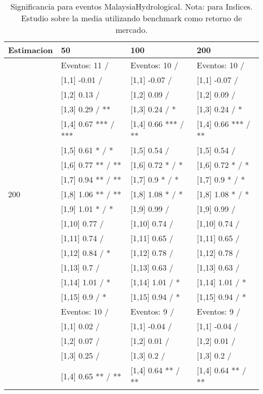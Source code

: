 \begin{table}

\caption{Significancia para eventos MalaysiaHydrological. Nota: para Indices. Estudio sobre la media utilizando benchmark como retorno de mercado.}
\centering
\begin{tabular}[t]{llll}
\toprule
Estimacion & 50 & 100 & 200\\
\midrule
 & Eventos:  11 / & Eventos:  10 / & Eventos:  10 /\\
 & {}[1,1] -0.01  / & {}[1,1] -0.07  / & {}[1,1] -0.07  /\\
 & {}[1,2] 0.13  / & {}[1,2] 0.09  / & {}[1,2] 0.09  /\\
 & {}[1,3] 0.29  / ** & {}[1,3] 0.24  / * & {}[1,3] 0.24  / *\\
 & {}[1,4] 0.67 *** / *** & {}[1,4] 0.66 *** / ** & {}[1,4] 0.66 *** / **\\
\addlinespace
 & {}[1,5] 0.61 * / * & {}[1,5] 0.54  / & {}[1,5] 0.54  /\\
 & {}[1,6] 0.77 ** / ** & {}[1,6] 0.72 * / * & {}[1,6] 0.72 * / *\\
 & {}[1,7] 0.94 ** / ** & {}[1,7] 0.9 * / * & {}[1,7] 0.9 * / *\\
200 & {}[1,8] 1.06 ** / ** & {}[1,8] 1.08 * / * & {}[1,8] 1.08 * / *\\
 & {}[1,9] 1.01 * / * & {}[1,9] 0.99  / & {}[1,9] 0.99  /\\
\addlinespace
 & {}[1,10] 0.77  / & {}[1,10] 0.74  / & {}[1,10] 0.74  /\\
 & {}[1,11] 0.74  / & {}[1,11] 0.65  / & {}[1,11] 0.65  /\\
 & {}[1,12] 0.84  / * & {}[1,12] 0.78  / & {}[1,12] 0.78  /\\
 & {}[1,13] 0.7  / & {}[1,13] 0.63  / & {}[1,13] 0.63  /\\
 & {}[1,14] 1.01  / * & {}[1,14] 1.01  / * & {}[1,14] 1.01  / *\\
\addlinespace
 & {}[1,15] 0.9  / * & {}[1,15] 0.94  / * & {}[1,15] 0.94  / *\\
 & Eventos:  10 / & Eventos:  9 / & Eventos:  9 /\\
 & {}[1,1] 0.02  / & {}[1,1] -0.04  / & {}[1,1] -0.04  /\\
 & {}[1,2] 0.07  / & {}[1,2] 0.01  / & {}[1,2] 0.01  /\\
 & {}[1,3] 0.25  / & {}[1,3] 0.2  / & {}[1,3] 0.2  /\\
\addlinespace
 & {}[1,4] 0.65 ** / ** & {}[1,4] 0.64 ** / ** & {}[1,4] 0.64 ** / **\\

\end{tabular}
\end{table}
